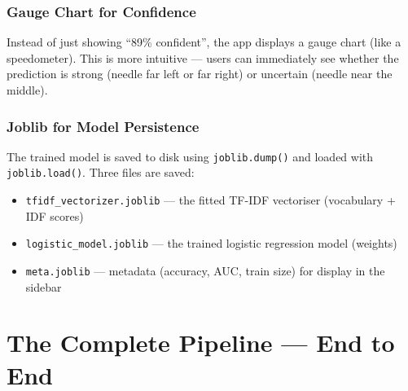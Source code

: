 \documentclass[12pt, a4paper]{article}
\begin{document}
\subsubsection{Gauge Chart for Confidence}

Instead of just showing ``89\% confident'', the app displays a gauge chart (like a speedometer). This is more intuitive — users can immediately see whether the prediction is strong (needle far left or far right) or uncertain (needle near the middle).

\subsubsection{Joblib for Model Persistence}

The trained model is saved to disk using \texttt{joblib.dump()} and loaded with \texttt{joblib.load()}. Three files are saved:
\begin{itemize}
  \item \texttt{tfidf\_vectorizer.joblib} — the fitted TF-IDF vectoriser (vocabulary + IDF scores)
  \item \texttt{logistic\_model.joblib} — the trained logistic regression model (weights)
  \item \texttt{meta.joblib} — metadata (accuracy, AUC, train size) for display in the sidebar
\end{itemize}

\newpage

\section{The Complete Pipeline — End to End}
\end{document}
